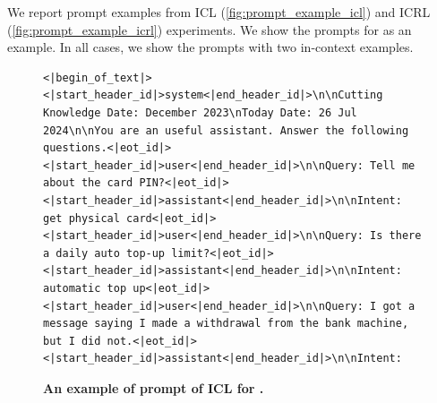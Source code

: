 We report prompt examples from ICL (\autoref{fig:prompt_example_icl}) and ICRL (\autoref{fig:prompt_example_icrl}) experiments. We show the prompts for \llama as an example. In all cases, we show the prompts with two in-context examples.




\begin{figure}[ht]
    \centering
    \begin{tcolorbox}[width=0.9\textwidth, fonttitle=\bfseries, title={Prompt example for ICL in \llama}]
\begin{Verbatim}[breaklines=true, breakanywhere=true]
<|begin_of_text|><|start_header_id|>system<|end_header_id|>\n\nCutting Knowledge Date: December 2023\nToday Date: 26 Jul 2024\n\nYou are an useful assistant. Answer the following questions.<|eot_id|><|start_header_id|>user<|end_header_id|>\n\nQuery: Tell me about the card PIN?<|eot_id|><|start_header_id|>assistant<|end_header_id|>\n\nIntent: get physical card<|eot_id|><|start_header_id|>user<|end_header_id|>\n\nQuery: Is there a daily auto top-up limit?<|eot_id|><|start_header_id|>assistant<|end_header_id|>\n\nIntent: automatic top up<|eot_id|><|start_header_id|>user<|end_header_id|>\n\nQuery: I got a message saying I made a withdrawal from the bank machine, but I did not.<|eot_id|><|start_header_id|>assistant<|end_header_id|>\n\nIntent:
\end{Verbatim}
    \end{tcolorbox}
    \caption{\textbf{An example of prompt of ICL for \llama.}}
    \label{fig:prompt_example_icl}
\end{figure}




